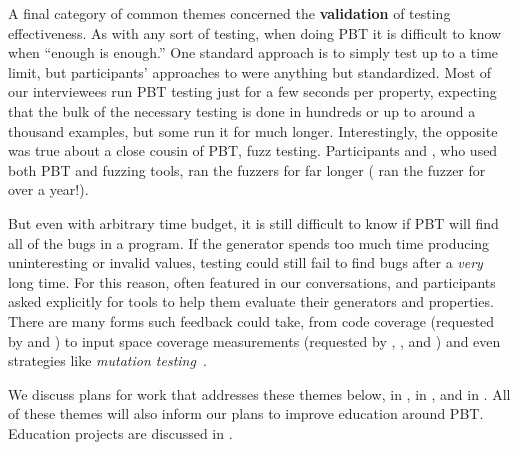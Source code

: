 A final category of common themes concerned the {\bf validation} of testing
effectiveness. As with any sort of testing, when doing PBT it is difficult to
know when ``enough is enough.'' One standard approach is to simply test up to a
time limit, but participants' approaches to 
were anything but standardized.
Most of our interviewees run PBT testing just for a few seconds per property,
expecting that the bulk of the necessary testing is done in hundreds or up to
around a thousand examples, but some run it for much longer.
Interestingly, the opposite was true about a close cousin of PBT, fuzz testing.
Participants  and , who used both PBT and
fuzzing tools, ran the fuzzers for far longer
( ran the fuzzer for over a year!).

But even with arbitrary time budget, it is still difficult to know if PBT will
find all of the bugs in a program. If the generator spends too much time
producing uninteresting or invalid values, testing could still fail to find bugs
after a {\em very} long time.
For this reason,  often featured in our
conversations, and participants asked explicitly for tools to help them evaluate
their generators and properties.
There are many forms such feedback could take, from code coverage (requested by
 and ) to input space coverage measurements
(requested by , , and ) and even
strategies like {\em mutation
  testing}~\cite{papadakis_mutation_2018}.

We discuss plans for work that addresses these themes below,  in ,  in
, and
 in .
%
All of these themes will also inform our plans to improve education around PBT.
Education projects are discussed in .
\iflater
{}
\fi

\iflater
{}
\fi

